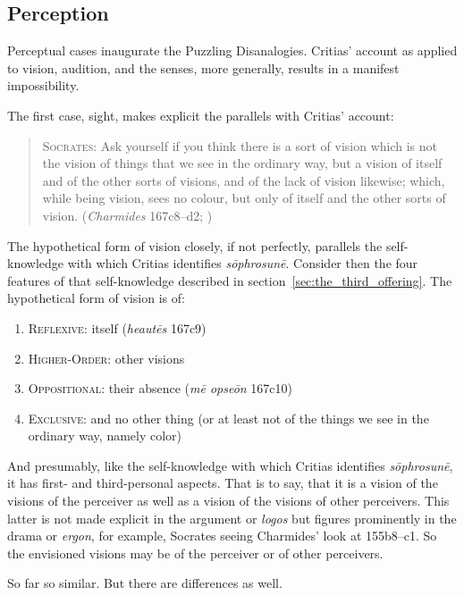 
\subsection{Perception} %
\label{sub:perception}

Perceptual cases inaugurate the Puzzling Disanalogies. Critias' account as applied to vision, audition, and the senses, more generally, results in a manifest impossibility.

The first case, sight, makes explicit the parallels with Critias' account:
\begin{quote}
	\textsc{Socrates}: Ask yourself if you think there is a sort of vision which is not the vision of things that we see in the ordinary way, but a vision of itself and of the other sorts of visions, and of the lack of vision likewise; which, while being vision, sees no colour, but only of itself and the other sorts of vision. (\emph{Charmides} 167c8–d2; \citealt[59]{Lamb:1927qw})
\end{quote}
The hypothetical form of vision closely, if not perfectly, parallels the self-knowledge with which Critias identifies \emph{sōphrosunē}. Consider then the four features of that self-knowledge described in section~\ref{sec:the_third_offering}. The hypothetical form of vision is of:
\begin{enumerate}[(1)]
	\item \textsc{Reflexive}: itself (\emph{heautēs} 167c9)
	\item \textsc{Higher-Order}: other visions
	\item \textsc{Oppositional}: their absence (\emph{mē opseōn} 167c10)
	\item \textsc{Exclusive}: and no other thing (or at least not of the things we see in the ordinary way, namely color)
\end{enumerate}
And presumably, like the self-knowledge with which Critias identifies \emph{sōphrosunē}, it has first- and third-personal aspects. That is to say, that it is a vision of the visions of the perceiver as well as a vision of the visions of other perceivers. This latter is not made explicit in the argument or \emph{logos} but figures prominently in the drama or \emph{ergon}, for example, Socrates seeing Charmides' look at 155b8–c1. So the envisioned visions may be of the perceiver or of other perceivers.

So far so similar. But there are differences as well.

